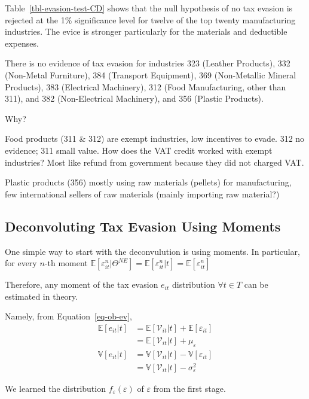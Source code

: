 \documentclass[
  12pt]{article}
\theoremstyle{definition}
\theoremstyle{remark}
\begin{document}
Table~\ref{tbl-evasion-test-CD} shows that the null hypothesis of no tax
evasion is rejected at the 1\% significance level for twelve of the top
twenty manufacturing industries. The evice is stronger particularly for
the materials and deductible expenses.

There is no evidence of tax evasion for industries 323 (Leather
Products), 332 (Non-Metal Furniture), 384 (Transport Equipment), 369
(Non-Metallic Mineral Products), 383 (Electrical Machinery), 312 (Food
Manufacturing, other than 311), and 382 (Non-Electrical Machinery), and
356 (Plastic Products).

Why?

Food products (311 \& 312) are exempt industries, low incentives to
evade. 312 no evidence; 311 small value. How does the VAT credit worked
with exempt industries? Most like refund from government because they
did not charged VAT.

Plastic products (356) mostly using raw materials (pellets) for
manufacturing, few international sellers of raw materials (mainly
importing raw material?)

\subsection{Deconvoluting Tax Evasion Using
Moments}\label{deconvoluting-tax-evasion-using-moments}

One simple way to start with the deconvulution is using moments. In
particular, for every \(n\)-th moment
\(\mathbb{E}[\varepsilon_{it}^n|\Theta^{NE}]=\mathbb{E}[\varepsilon_{it}^n|t]=\mathbb{E}[\varepsilon_{it}^n]\)

Therefore, any moment of the tax evasion \(e_{it}\) distribution
\(\forall t\in T\) can be estimated in theory.

Namely, from Equation~\ref{eq-ob-ev}, \[
\begin{aligned}
  \mathbb{E}[e_{it}|t]&=\mathbb{E}[\mathcal V_{it}|t]+\mathbb{E}[\varepsilon_{it}]\\
  &=\mathbb{E}[\mathcal V_{it}|t]+\mu_{\varepsilon}
  \\
  \mathbb{V}[e_{it}|t]&=\mathbb{V}[\mathcal V_{it}|t]-\mathbb{V}[\varepsilon_{it}]\\
  &=\mathbb{V}[\mathcal V_{it}|t]-\sigma^2_{\varepsilon}
\end{aligned}
\]

We learned the distribution \(f_\varepsilon(\varepsilon)\) of
\(\varepsilon\) from the first stage.
\end{document}
